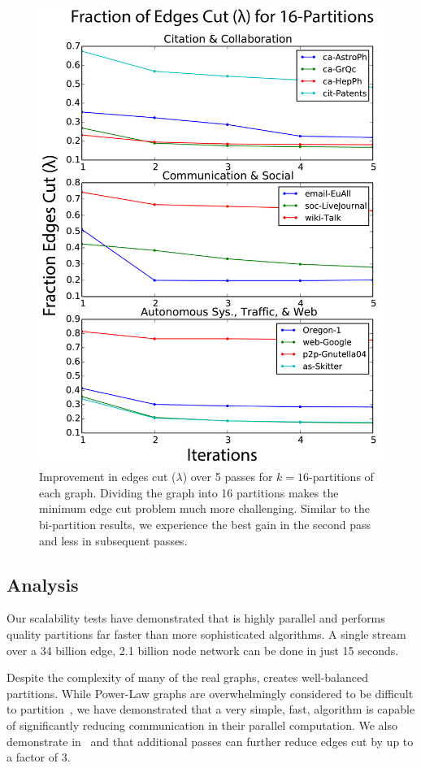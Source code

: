 \begin{figure}[t!]
\centering
\includegraphics[width=0.9\columnwidth] {figures/real_k16_lambda.pdf}
\caption[Caption for]{Improvement in edges cut ($\lambda$) over 5 passes for $k=16$-partitions of each graph. Dividing the graph into 16 partitions makes the minimum edge cut problem much more challenging. Similar to the bi-partition results, we experience the best gain in the second pass and less in subsequent passes.}
\label{fig:k16_lambda}
\end{figure}

\subsection{Analysis}
Our scalability tests have demonstrated that \ourmethod is highly parallel and performs quality partitions far faster than more sophisticated algorithms. A single stream over a 34 billion edge, 2.1 billion node network can be done in just 15 seconds.

Despite the complexity of many of the real graphs, \ourmethod creates well-balanced partitions.
While Power-Law graphs are overwhelmingly considered to be difficult to partition~\cite{Abou-Rjeili:2006:MAP:1898953.1899055}, we have demonstrated that a very simple, fast, algorithm is capable of significantly reducing communication in their parallel computation. We also demonstrate in~ and  that additional passes can further reduce edges cut by up to a factor of 3. 

